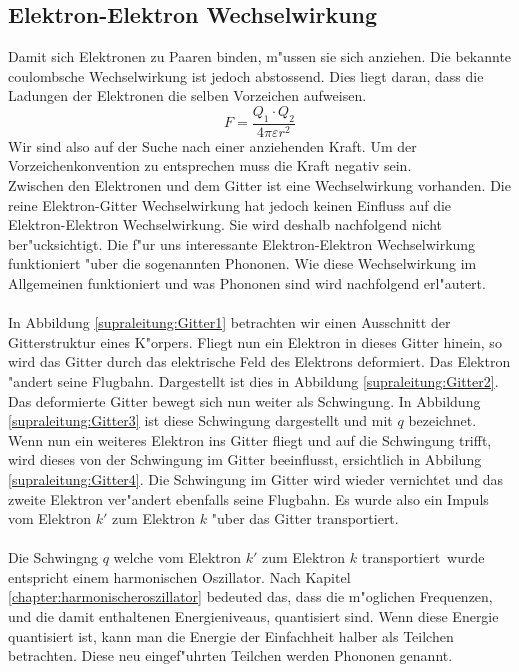 \begin{refsection}
\section{Elektron-Elektron Wechselwirkung\label{supraleitung:elektronelektronwecheslwirkung}}
Damit sich Elektronen zu Paaren binden, m"ussen sie sich anziehen. Die bekannte coulombsche Wechselwirkung ist jedoch abstossend. Dies liegt daran, dass die Ladungen der Elektronen die selben Vorzeichen aufweisen.
\begin{equation}
F = \frac{Q_1\cdot Q_2}{4\pi \varepsilon r^2}
\label{supraleitung:Coulomb}
\end{equation}
Wir sind also auf der Suche nach einer anziehenden Kraft. Um der Vorzeichenkonvention zu entsprechen muss die Kraft negativ sein.
\\
Zwischen den Elektronen und dem Gitter ist eine Wechselwirkung vorhanden. Die reine Elektron-Gitter Wechselwirkung hat jedoch keinen Einfluss auf die Elektron-Elektron Wechselwirkung. Sie wird deshalb nachfolgend nicht ber"ucksichtigt.
Die f"ur uns interessante Elektron-Elektron Wechselwirkung funktioniert "uber die sogenannten Phononen. Wie diese Wechselwirkung im Allgemeinen funktioniert und was Phononen sind wird nachfolgend erl"autert.
\\
\\
In Abbildung \ref{supraleitung:Gitter1} betrachten wir einen Ausschnitt der Gitterstruktur eines K"orpers. Fliegt nun ein Elektron in dieses Gitter hinein, so wird das Gitter durch das elektrische Feld des Elektrons deformiert. Das Elektron "andert seine Flugbahn. Dargestellt ist dies in Abbildung \ref{supraleitung:Gitter2}. Das deformierte Gitter bewegt sich nun weiter als Schwingung. In Abbildung \ref{supraleitung:Gitter3} ist diese Schwingung dargestellt und mit $q$ bezeichnet. Wenn nun ein weiteres Elektron ins Gitter fliegt und auf die Schwingung trifft, wird dieses von der Schwingung im Gitter beeinflusst, ersichtlich in Abbilung \ref{supraleitung:Gitter4}. Die Schwingung im Gitter wird wieder vernichtet und das zweite Elektron ver"andert ebenfalls seine Flugbahn. Es wurde also ein Impuls vom Elektron $k'$ zum Elektron $k$ "uber das Gitter transportiert. 
\\
\\
Die Schwingng $q$ welche vom Elektron $k'$ zum Elektron $k$ \glqq transportiert\grqq~wurde entspricht einem harmonischen Oszillator. Nach Kapitel \ref{chapter:harmonischeroszillator} bedeuted das, dass die m"oglichen Frequenzen, und die damit enthaltenen Energieniveaus, quantisiert sind. Wenn diese Energie quantisiert ist, kann man die Energie der Einfachheit halber als Teilchen betrachten. Diese neu eingef"uhrten Teilchen werden Phononen genannt.

\end{refsection}

